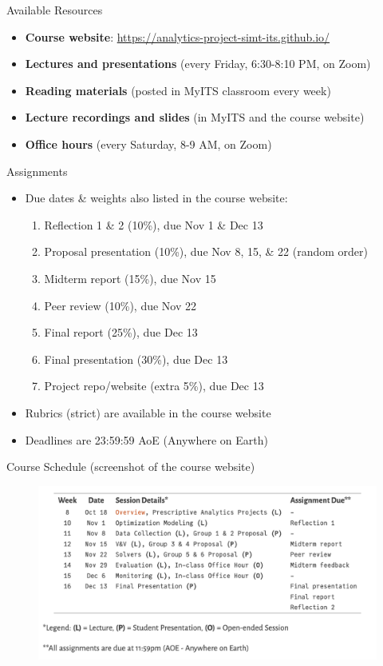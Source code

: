 \documentclass [xcolor=svgnames, handout]{beamer}
\begin{document}
\begin{frame}{Available Resources}
    \begin{itemize}[<.->]
        \item \textbf{Course website}: \url{https://analytics-project-simt-its.github.io/}
        \item \textbf{Lectures and presentations} (every Friday, 6:30-8:10 PM, on Zoom)
        \item \textbf{Reading materials} (posted in MyITS classroom every week)
        \item  \textbf{Lecture recordings and slides} (in MyITS and the course website)
        \item \textbf{Office hours} (every Saturday, 8-9 AM, on Zoom)
    \end{itemize}    
\end{frame}


\begin{frame}{Assignments}
    \begin{itemize}[<+->]
        \item Due dates \& weights also listed in the course website:        
        \begin{enumerate}[<+->]
            \item Reflection 1 \& 2 (10\%), due Nov 1 \& Dec 13
            \item Proposal presentation (10\%), due Nov 8, 15, \& 22 (random order)
            \item Midterm report (15\%), due Nov 15
            \item Peer review (10\%), due Nov 22        
            \item Final report (25\%), due Dec 13
            \item Final presentation (30\%), due Dec 13
            \item Project repo/website (extra 5\%), due Dec 13
        \end{enumerate}
        \item Rubrics (strict) are available in the course website
        \item Deadlines are 23:59:59 AoE (Anywhere on Earth)
    \end{itemize}
\end{frame}


\begin{frame}{Course Schedule (screenshot of the course website)}
    \begin{figure}
        \centering
        \includegraphics[width=0.9\linewidth]{../fig/schedule.png}        
    \end{figure}  
\end{frame}
\end{document}
